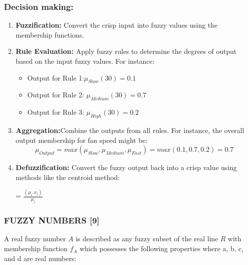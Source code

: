 \documentclass[12pt,a4paper]{article}
\begin{document}
\subsubsection*{Decision making:}
\begin{enumerate}
    \item \textbf{Fuzzification: }Convert the crisp input into fuzzy values using the membership functions.

    \item \textbf{Rule Evaluation:} Apply fuzzy rules to determine the degrees of output based on the input fuzzy values. For instance:

    \begin{itemize}
        \item Output for Rule 1:$\mu_{Slow}(30)=0.1$

        \item Output for Rule 2: $\mu_{Medium}(30)=0.7$

        \item Output for Rule 3: $\mu_{High}(30)=0.2$
        
    \end{itemize}

   \item \textbf{	Aggregation:}Combine the outputs from all rules. For instance, the overall output membership for fan speed might be: 
   \begin{equation*}
\mu_{Output}=max(\mu_{Slow},\mu_{Medium},\mu_{Fast})=max(0.1,0.7,0.2)=0.7
   \end{equation*}

   \item \textbf{	Defuzzification:} Convert the fuzzy output back into a crisp value using methods like the centroid method:\\
\begin{center}
    = $\frac{(\mu_{i}.x_{i})}{\mu_{i}}$
\end{center}
\end{enumerate}
    
\subsubsection*{FUZZY NUMBERS [9]}

 \hspace{1em}A real fuzzy number $A$ is described as any fuzzy subset of the real line $R$ with membership function $f_{A}$ which possesses the following properties where a, b, c, and d are real numbers:
\end{document}
